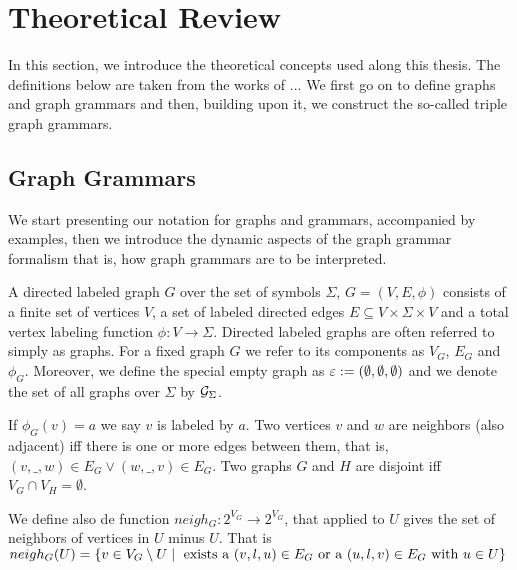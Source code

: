 \documentclass[]{report}
\title{}
\author{William Bombardelli da Silva}
\begin{document}
\maketitle

\begin{abstract}
\end{abstract}

\section{Theoretical Review}
In this section, we introduce the theoretical concepts used along this thesis. The definitions below are taken from the works of ...%
We first go on to define graphs and graph grammars and then, building upon it, we construct the so-called triple graph grammars.

\subsection{Graph Grammars}
We start presenting our notation for graphs and grammars, accompanied by examples, then we introduce the dynamic aspects of the graph grammar formalism that is, how graph grammars are to be interpreted.


\begin{definition}
	\label{def:graph}
	A directed labeled graph $G$ over the set of symbols $\Sigma$, $G = (V, E, \phi)$ consists of a finite set of vertices $V$, a set of labeled directed edges $E \subseteq V \times \Sigma \times V$ and a total vertex labeling function $\phi : V \to \Sigma$. Directed labeled graphs are often referred to simply as graphs. For a fixed graph $G$ we refer to its components as $V_G$, $E_G$ and $\phi_G$. Moreover, we define the special empty graph as $\varepsilon := (\emptyset, \emptyset, \emptyset)$ and we denote the set of all graphs over $\Sigma$ by $\mathcal{G}_{\Sigma}$.
	
	If $\phi_G(v) = a$ we say $v$ is labeled by $a$. Two vertices $v$ and $w$ are neighbors (also adjacent) iff there is one or more edges between them, that is, $(v,\_,w) \in E_G \lor (w,\_,v) \in E_G$. Two graphs $G$ and $H$ are disjoint iff $V_G \cap V_H = \emptyset$.
	
	We define also de function $neigh_G: 2^{V_G} \to 2^{V_G}$, that applied to $U$ gives the set of neighbors of vertices in $U$ minus $U$. That is $neigh_G(U) = \{ v \in V_G \setminus U \; | \; \text{ exists a } (v,l,u) \in E_G \text{ or a } (u,l,v) \in E_G \text{ with } u \in U \}$
\end{definition}
\end{document}
